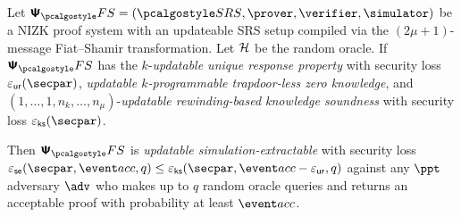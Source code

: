 
\begin{theorem}
	\label{thm:se}
	Let $\psfs = (\SRScer, \prover, \verifier, \simulator)$ be a NIZK proof system with an updateable SRS setup compiled via the $(2\mu + 1)$-message Fiat--Shamir transformation. Let $\mathcal{H}$ be the random oracle. If $\psfs$ has the
	$k$-\emph{updatable unique response property} with security loss $\epsur(\secpar)$, 
	\emph{updatable $k$-programmable trapdoor-less zero knowledge}, and $(1, \ldots, 1, n_{k}, \ldots, n_\mu)$-\emph{updatable rewinding-based knowledge soundness} with security loss $\epscss(\secpar)$. 
	
	Then $\psfs$ is \emph{updatable simulation-extractable} with security loss $\epsse(\secpar,\accProb,q) \leq \epscss(\secpar,\accProb - \epsur,q)$ against any $\ppt$ adversary $\advse$ who makes up to $q$ random oracle queries and returns an acceptable proof with probability at least $\accProb$.
\end{theorem}

